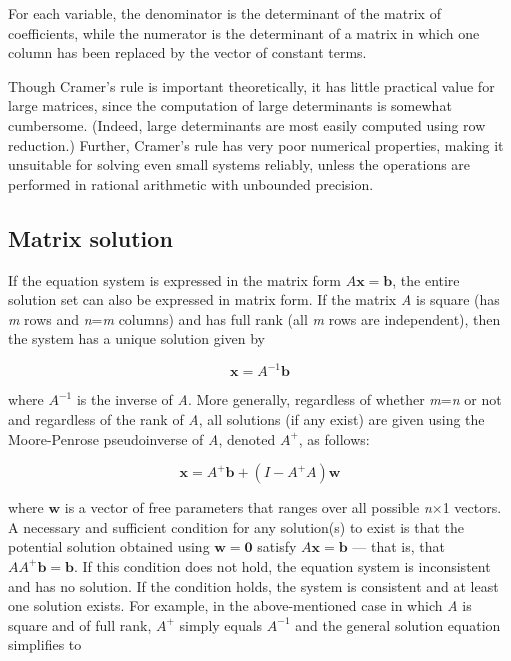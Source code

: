 For each variable, the denominator is the determinant of the matrix of coefficients, while
the numerator is the determinant of a matrix in which one column has been replaced by the
vector of constant terms.



Though Cramer's rule is important theoretically, it has little practical value for large
matrices, since the computation of large determinants is somewhat cumbersome. (Indeed,
large determinants are most easily computed using row reduction.) Further, Cramer's rule
has very poor numerical properties, making it unsuitable for solving even small systems
reliably, unless the operations are performed in rational arithmetic with unbounded
precision.




\subsection{Matrix solution}
\label{sss:matr-3ad5}




If the equation system is expressed in the matrix form $A\mathbf{x}=\mathbf{b}$, the
entire solution set can also be expressed in matrix form. If the matrix \textit{A} is
square (has \textit{m} rows and \textit{n}=\textit{m} columns) and has full rank (all
\textit{m} rows are independent), then the system has a unique solution given by



$$\mathbf{x}=A^{-1}\mathbf{b}$$



where $A^{-1}$ is the inverse of \textit{A}. More generally, regardless of whether
\textit{m}=\textit{n} or not and regardless of the rank of \textit{A}, all solutions (if
any exist) are given using the Moore-Penrose pseudoinverse of \textit{A}, denoted $A^+$,
as follows:



$$\mathbf{x}=A^+ \mathbf{b} + \left(I - A^+ A\right)\mathbf{w}$$



where $\mathbf{w}$ is a vector of free parameters that ranges over all possible
\textit{n}$\times$1 vectors. A necessary and sufficient condition for any solution(s) to exist is
that the potential solution obtained using $\mathbf{w}=\mathbf{0}$ satisfy
$A\mathbf{x}=\mathbf{b}$ — that is, that $AA^+ \mathbf{b}=\mathbf{b}.$ If this condition
does not hold, the equation system is inconsistent and has no solution. If the condition
holds, the system is consistent and at least one solution exists. For example, in the
above-mentioned case in which \textit{A} is square and of full rank, $A^+$ simply equals
$A^{-1}$ and the general solution equation simplifies to



